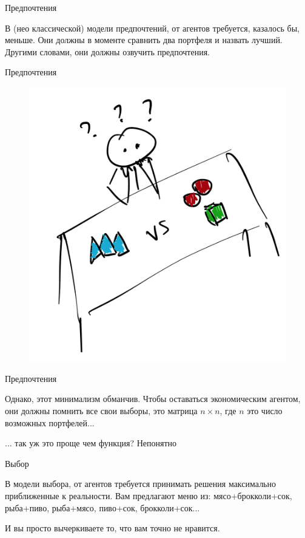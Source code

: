 \documentclass{beamer}
\begin{document}
\begin{frame}{Предпочтения}

В (нео классической) модели предпочтений, от агентов требуется, казалось бы, меньше. Они должны в моменте сравнить два портфеля и назвать лучший. Другими словами, они должны озвучить предпочтения.

\end{frame}

\begin{frame}{Предпочтения}

\begin{figure}[hbt]
\centering
\includegraphics[width=.7 \textwidth]{pic4}
\end{figure}

\end{frame}

\begin{frame}{Предпочтения}

Однако, этот минимализм обманчив. Чтобы оставаться экономическим агентом, они должны помнить все свои выборы, это матрица $n \times n$, где $n$ это число возможных портфелей...

... так уж это проще чем функция? Непонятно

\end{frame}

\begin{frame}{Выбор}

В модели выбора, от агентов требуется принимать решения максимально приближенные к реальности. Вам предлагают меню из: мясо+брокколи+сок, рыба+пиво, рыба+мясо, пиво+сок, брокколи+сок...

И вы просто вычеркиваете то, что вам точно не нравится.

\end{frame}
\end{document}
